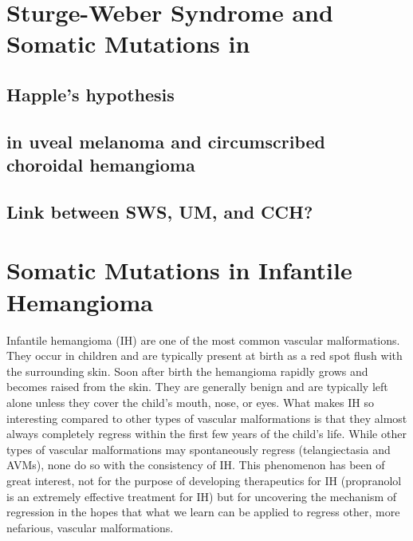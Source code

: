 \section{Sturge-Weber Syndrome and Somatic Mutations in }
\subsection{Happle's hypothesis}
\subsection{ in uveal melanoma and circumscribed choroidal hemangioma}
\subsection{Link between SWS, UM, and CCH?}







\section{Somatic Mutations in Infantile Hemangioma}
Infantile hemangioma (IH) are one of the most common vascular malformations. They occur in children and are typically present at birth as a red spot flush with the surrounding skin. Soon after birth the hemangioma rapidly grows and becomes raised from the skin. They are generally benign and are typically left alone unless they cover the child's mouth, nose, or eyes. What makes IH so interesting compared to other types of vascular malformations is that they almost always completely regress within the first few years of the child's life. While other types of vascular malformations may spontaneously regress (telangiectasia and AVMs), none do so with the consistency of IH. This phenomenon has been of great interest, not for the purpose of developing therapeutics for IH (propranolol is an extremely effective treatment for IH) but for uncovering the mechanism of regression in the hopes that what we learn can be applied to regress other, more nefarious, vascular malformations. 


